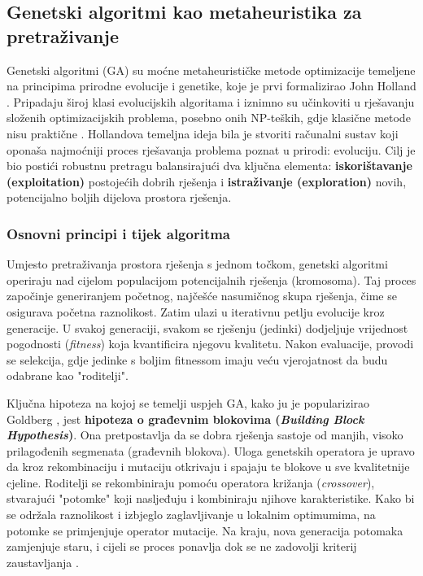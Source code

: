 \subsection{Genetski algoritmi kao metaheuristika za pretraživanje}
\label{sec:ga}
Genetski algoritmi (GA) su moćne metaheurističke metode optimizacije temeljene na principima prirodne evolucije i genetike, koje je prvi formalizirao John Holland \cite{Holland1975}. Pripadaju široj klasi evolucijskih algoritama i iznimno su učinkoviti u rješavanju složenih optimizacijskih problema, posebno onih NP-teških, gdje klasične metode nisu praktične \cite{Gandomi2013, Mitchell1998}. Hollandova temeljna ideja bila je stvoriti računalni sustav koji oponaša najmoćniji proces rješavanja problema poznat u prirodi: evoluciju. Cilj je bio postići robustnu pretragu balansirajući dva ključna elementa: \textbf{iskorištavanje (exploitation)} postojećih dobrih rješenja i \textbf{istraživanje (exploration)} novih, potencijalno boljih dijelova prostora rješenja.
\subsubsection{Osnovni principi i tijek algoritma}

Umjesto pretraživanja prostora rješenja s jednom točkom, genetski algoritmi operiraju nad cijelom populacijom potencijalnih rješenja (kromosoma). Taj proces započinje generiranjem početnog, najčešće nasumičnog skupa rješenja, čime se osigurava početna raznolikost. Zatim ulazi u iterativnu petlju evolucije kroz generacije. U svakoj generaciji, svakom se rješenju (jedinki) dodjeljuje vrijednost pogodnosti (\textit{fitness}) koja kvantificira njegovu kvalitetu. Nakon evaluacije, provodi se selekcija, gdje jedinke s boljim fitnessom imaju veću vjerojatnost da budu odabrane kao "roditelji".

Ključna hipoteza na kojoj se temelji uspjeh GA, kako ju je popularizirao Goldberg \cite{Goldberg1989}, jest \textbf{hipoteza o građevnim blokovima (\textit{Building Block Hypothesis})}. Ona pretpostavlja da se dobra rješenja sastoje od manjih, visoko prilagođenih segmenata (građevnih blokova). Uloga genetskih operatora je upravo da kroz rekombinaciju i mutaciju otkrivaju i spajaju te blokove u sve kvalitetnije cjeline. Roditelji se rekombiniraju pomoću operatora križanja (\textit{crossover}), stvarajući "potomke" koji nasljeđuju i kombiniraju njihove karakteristike. Kako bi se održala raznolikost i izbjeglo zaglavljivanje u lokalnim optimumima, na potomke se primjenjuje operator mutacije. Na kraju, nova generacija potomaka zamjenjuje staru, i cijeli se proces ponavlja dok se ne zadovolji kriterij zaustavljanja \cite{Goldberg1989, Mitchell1998}.
